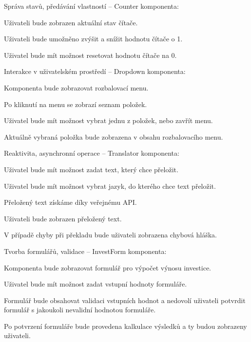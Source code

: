 \begin{citemize}
	\item Správa stavů, předávání vlastností -- Counter komponenta:
	
	\begin{cenumerate}
		\item Uživateli bude zobrazen aktuální stav čítače.
		\item Uživateli bude umožněno zvýšit a snížit hodnotu čítače o 1.
		\item Uživatel bude mít možnost resetovat hodnotu čítače na 0.
	\end{cenumerate}

	\item Interakce v uživatelském prostředí -- Dropdown komponenta:
	
	\begin{cenumerate}
		\item Komponenta bude zobrazovat rozbalovací menu.
		\item Po kliknutí na menu se zobrazí seznam položek.
		\item Uživatel bude mít možnost vybrat jednu z položek, nebo zavřít menu.
		\item Aktuálně vybraná položka bude zobrazena v obsahu rozbalovacího menu.
	\end{cenumerate}

	\item Reaktivita, asynchronní operace -- Translator komponenta:
	
	\begin{cenumerate}
		\item Uživatel bude mít možnost zadat text, který chce přeložit.
		\item Uživatel bude mít možnost vybrat jazyk, do kterého chce text přeložit.
		\item Přeložený text získáme díky veřejnému API.
		\item Uživateli bude zobrazen přeložený text.
		\item V případě chyby při překladu bude uživateli zobrazena chybová hláška.
	\end{cenumerate}

	\item Tvorba formulářů, validace -- InvestForm komponenta:
	
	\begin{cenumerate}
		\item Komponenta bude zobrazovat formulář pro výpočet výnosu investice.
		\item Uživatel bude mít možnost zadat vstupní hodnoty formuláře.
		\item Formulář bude obsahovat validaci vstupních hodnot a nedovolí uživateli potvrdit formulář s jakoukoli nevalidní hodnotou formuláře.
		\item Po potvrzení formuláře bude provedena kalkulace výsledků a ty budou zobrazeny uživateli.
	\end{cenumerate}


\end{citemize}
